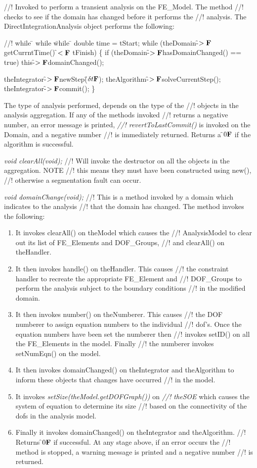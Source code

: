 //! Invoked to perform a transient analysis on the FE\_Model. The method
//! checks to see if the domain has changed before it performs the
//! analysis. The DirectIntegrationAnalysis object performs the following:
\begin{tabbing}
//! while \= \+ while \= while \= \kill
    double time = tStart;
    while (theDomain-\f$>{\bf F}$getCurrntTime() \f$<{\bf F}$ tFinish) \{ \+
       if (theDomain-\f$>{\bf F}$hasDomainChanged() == true) \+
           this-\f$>{\bf F}$domainChanged(); \-

	theIntegrator-\f$>{\bf F}$newStep(\f$\delta t{\bf F}$);
	theAlgorithm-\f$>{\bf F}$solveCurrentStep();
        theIntegrator-\f$>{\bf F}$commit(); \-
    \}
\end{tabbing}
\noindent The type of analysis performed, depends on the type of the
//! objects in the analysis aggregation. If any of the methods invoked
//! returns a negative number, an error message is printed, {\em
//! revertToLastCommit()} is invoked on the Domain, and a negative number
//! is immediately returned. Returns a \f$0{\bf F}$ if the algorithm is successful.

{\em void clearAll(void);}
//! Will invoke the destructor on all the objects in the aggregation. NOTE
//! this means they must have been constructed using new(),
//! otherwise a segmentation fault can occur.

{\em void domainChange(void);}
//! This is a method invoked by a domain which indicates to the analysis
//! that the domain has changed. The method invokes the following:
\begin{enumerate} 
\item It invokes clearAll() on \p theModel which causes the
//! AnalysisModel to clear out its list of FE\_Elements and DOF\_Groups,
//! and clearAll() on \p theHandler.
\item It then invokes handle() on \p theHandler. This causes
//! the constraint handler to recreate the appropriate FE\_Element and
//! DOF\_Groups to perform the analysis subject to the boundary conditions
//! in the modified domain.
\item It then invokes number() on \p theNumberer. This causes
//! the DOF numberer to assign equation numbers to the individual
//! dof's. Once the equation numbers have been set the numberer then
//! invokes setID() on all the FE\_Elements in the model. Finally
//! the numberer invokes setNumEqn() on the model.
\item It then invokes domainChanged() on \p theIntegrator and
\p theAlgorithm to inform these objects that changes have occurred
//! in the model.
\item It invokes {\em setSize(theModel.getDOFGraph())} on {\em
//! theSOE} which causes the system of equation to determine its size
//! based on the connectivity of the dofs in the analysis model. 
\item Finally it invokes domainChanged() on \p theIntegrator and 
\p theAlgorithm. 
//! Returns \f$0{\bf F}$ if successful. At any stage above, if an error occurs the
//! method is stopped, a warning message is printed and a negative number
//! is returned. 
\end{enumerate}


